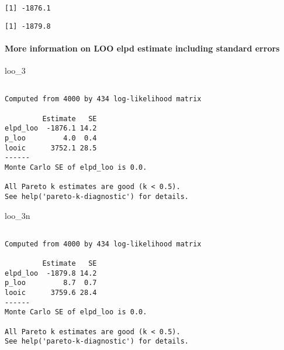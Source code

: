 \documentclass[
]{article}
\newenvironment{Shaded}{\begin{snugshade}}{\end{snugshade}}
\newcommand{\DecValTok}[1]{\textcolor[rgb]{0.00,0.00,0.81}{#1}}
\newcommand{\KeywordTok}[1]{\textcolor[rgb]{0.13,0.29,0.53}{\textbf{#1}}}
\newcommand{\NormalTok}[1]{#1}
\newcommand{\OperatorTok}[1]{\textcolor[rgb]{0.81,0.36,0.00}{\textbf{#1}}}
\newcommand{\StringTok}[1]{\textcolor[rgb]{0.31,0.60,0.02}{#1}}
\begin{document}
\begin{verbatim}
[1] -1876.1
\end{verbatim}

\begin{Shaded}
\end{Shaded}

\begin{verbatim}
[1] -1879.8
\end{verbatim}

\hypertarget{more-information-on-loo-elpd-estimate-including-standard-errors}{%
\paragraph{More information on LOO elpd estimate including standard
errors}\label{more-information-on-loo-elpd-estimate-including-standard-errors}}

\begin{Shaded}
\begin{Highlighting}[]
\NormalTok{loo_}\DecValTok{3}
\end{Highlighting}
\end{Shaded}

\begin{verbatim}

Computed from 4000 by 434 log-likelihood matrix

         Estimate   SE
elpd_loo  -1876.1 14.2
p_loo         4.0  0.4
looic      3752.1 28.5
------
Monte Carlo SE of elpd_loo is 0.0.

All Pareto k estimates are good (k < 0.5).
See help('pareto-k-diagnostic') for details.
\end{verbatim}

\begin{Shaded}
\begin{Highlighting}[]
\NormalTok{loo_3n}
\end{Highlighting}
\end{Shaded}

\begin{verbatim}

Computed from 4000 by 434 log-likelihood matrix

         Estimate   SE
elpd_loo  -1879.8 14.2
p_loo         8.7  0.7
looic      3759.6 28.4
------
Monte Carlo SE of elpd_loo is 0.0.

All Pareto k estimates are good (k < 0.5).
See help('pareto-k-diagnostic') for details.
\end{verbatim}
\end{document}

